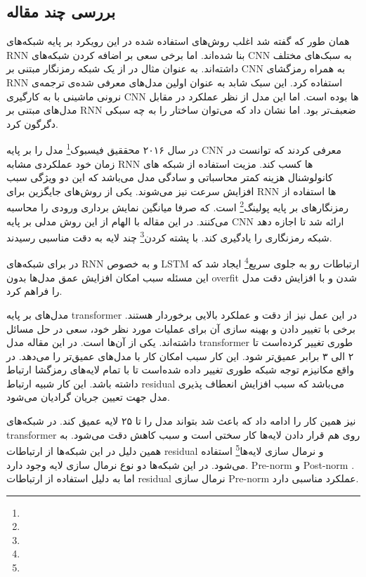 \documentclass[12pt, a4paper, oneside]{report}
\begin{document}
\subsection{بررسی چند مقاله}

همان طور که گفته شد اغلب روش‌های استفاده شده در این رویکرد بر پایه شبکه‌های
RNN
بنا شده‌اند. اما برخی سعی بر اضافه کردن شبکه‌های
CNN
به سبک‌های مختلف داشته‌اند. به عنوان مثال در
\cite{kalchbrenner2013recurrent}
از یک شبکه رمزنگار مبتنی بر
CNN
به همراه رمزگشای
RNN
استفاده کرد. این سبک شابد به عنوان اولین مدل‌های معرفی شده‌ی ترجمه‌ی نرونی ماشینی با به کارگیری
CNN
ها بوده است. اما این مدل از نظر عملکرد در مقابل مدل‌های مبتنی بر
RNN
ضعبف‌تر بود. اما نشان داد که می‌توان ساختار را به چه سبکی دگرگون کرد.

در سال ۲۰۱۶ محققیق
فیسبوک\footnote{}
مدل
\cite{gehring2017convolutional}
را بر پایه
CNN
معرفی کردند که توانست در زمان خود عملکردی مشابه
RNN
ها کسب کند. مزیت استفاده از شبکه های کانولوشنال هزینه کمتر محاسباتی و سادگی مدل می‌باشد که این دو
ویژگی سبب افزایش سرعت نیز می‌شوند. یکی از روش‌های جایگزین برای
RNN
ها استفاده از
رمزنگار‌های بر پایه پولینگ\footnote{}
است. که صرفا میانگین نمایش برداری ورودی را محاسبه می‌کنند. در این مقاله با الهام از این روش
مدلی بر پایه
CNN
ارائه شد تا اجازه دهد شبکه رمزنگاری را یادگیری کند. با
پشته کردن\footnote{}
چند لایه به دقت مناسبی رسیدند.

در
\cite{zhou2016deep}
برای شبکه‌های
RNN
و به خصوص
LSTM
ارتباطات رو به جلوی سریع\footnote{}
ایجاد شد که این مسئله سبب امکان افزایش عمق مدل‌ها بدون
overfit
شدن و با افزایش دقت مدل را فراهم کرد.

مدل‌های بر پایه
transformer
در این عمل نیز از دقت و عملکرد بالایی برخوردار هستند. برخی با تغییر دادن و بهینه سازی آن برای
عملیات مورد نظر خود، سعی در حل مسائل داشته‌اند.
\cite{bapna2018training}
یکی از آن‌ها است. در این مقاله مدل
transformer
طوری تغییر کرده‌است تا ۲ الی ۳ برابر عمیق‌تر شود. این کار سبب امکان کار با مدل‌های عمیق‌تر را می‌دهد.
در واقع مکانیزم توجه شبکه طوری تغییر داده شده‌است تا با تمام لایه‌های رمزگشا ارتباط داشته باشد. این کار شبیه
ارتباط
residual
می‌باشد که سبب افزایش انعطاف پذیری مدل جهت تعیین جریان گرادیان می‌شود.

\cite{wang2019learning}
نیز همین کار را ادامه داد که باعث شد بتواند مدل را تا ۲۵ لایه عمیق کند.  
در شبکه‌های
transformer
روی هم قرار دادن لایه‌ها کار سختی است و سبب کاهش دقت می‌شود. به همین دلیل در این شبکه‌ها
از ارتباطات
residual
و نرمال سازی لایه‌ها\footnote{}
استفاده می‌شود. در این شبکه‌ها دو نوع نرمال سازی لایه وجود دارد.
Pre-norm
و
Post-norm
. اما به دلیل استفاده از ارتباطات
residual
نرمال سازی
Pre-norm
عملکرد مناسبی دارد.
\end{document}
